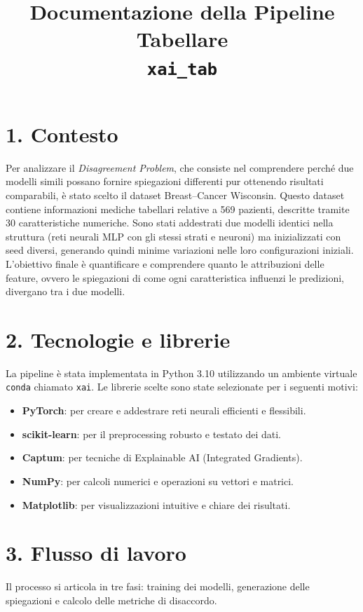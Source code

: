 \documentclass[a4paper,11pt]{article}
\title{Documentazione della Pipeline Tabellare \\ \texttt{xai\_tab}}
\begin{document}
\maketitle

\section*{1. Contesto}
Per analizzare il \emph{Disagreement Problem}, che consiste nel comprendere perché due modelli simili possano fornire spiegazioni differenti pur ottenendo risultati comparabili, è stato scelto il dataset Breast–Cancer Wisconsin. Questo dataset contiene informazioni mediche tabellari relative a 569 pazienti, descritte tramite 30 caratteristiche numeriche. Sono stati addestrati due modelli identici nella struttura (reti neurali MLP con gli stessi strati e neuroni) ma inizializzati con seed diversi, generando quindi minime variazioni nelle loro configurazioni iniziali. L'obiettivo finale è quantificare e comprendere quanto le attribuzioni delle feature, ovvero le spiegazioni di come ogni caratteristica influenzi le predizioni, divergano tra i due modelli.

\section*{2. Tecnologie e librerie}
La pipeline è stata implementata in Python 3.10 utilizzando un ambiente virtuale \texttt{conda} chiamato \texttt{xai}. Le librerie scelte sono state selezionate per i seguenti motivi:
\begin{itemize}
\item \textbf{PyTorch}: per creare e addestrare reti neurali efficienti e flessibili.
\item \textbf{scikit-learn}: per il preprocessing robusto e testato dei dati.
\item \textbf{Captum}: per tecniche di Explainable AI (Integrated Gradients).
\item \textbf{NumPy}: per calcoli numerici e operazioni su vettori e matrici.
\item \textbf{Matplotlib}: per visualizzazioni intuitive e chiare dei risultati.
\end{itemize}

\section*{3. Flusso di lavoro}
Il processo si articola in tre fasi: training dei modelli, generazione delle spiegazioni e calcolo delle metriche di disaccordo.
\end{document}
